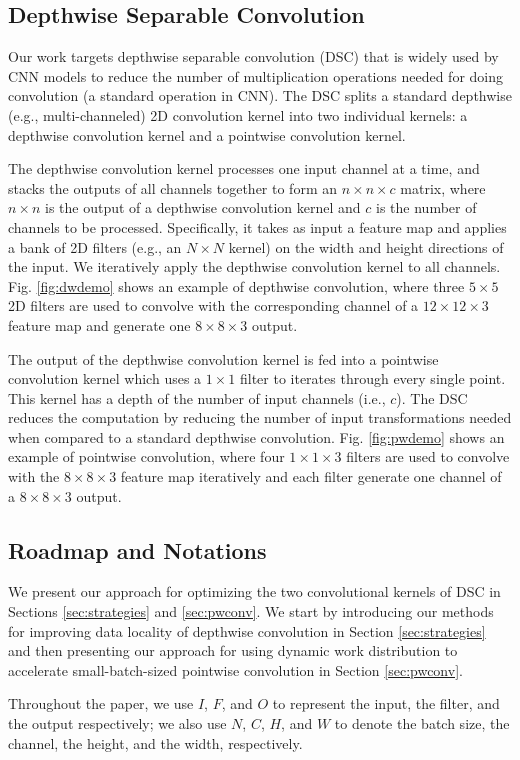 \subsection{Depthwise Separable Convolution}
Our work targets depthwise separable convolution (DSC) that is widely used by  CNN  models to reduce the number of multiplication
operations needed for doing convolution (a standard operation in CNN). The DSC splits a standard depthwise (e.g., multi-channeled) 2D
convolution kernel into two individual kernels: a depthwise convolution kernel and a pointwise convolution kernel. 

The depthwise
convolution kernel processes one input channel at a time, and stacks the outputs of all channels together to form an $n \times n \times c$
matrix, where $n \times n$ is the output of a depthwise convolution kernel and $c$ is the number of channels to be processed. Specifically,
it takes as input a feature map and applies a bank of 2D filters (e.g., an $N \times N$ kernel) on the width and height directions of
the input. We iteratively apply the depthwise convolution kernel to all channels. Fig. \ref{fig:dwdemo} shows an example of depthwise convolution, where three $5 \times 5$ 2D filters are used to convolve with the corresponding channel of a $12 \times 12 \times 3$ feature map and generate one $8 \times 8 \times 3$ output. 

The output of the depthwise convolution kernel is fed
into a pointwise convolution kernel which uses a $1 \times 1$ filter to iterates through every single point. This kernel has a depth of the
number of input channels (i.e., $c$). The DSC reduces the computation by reducing the number of input transformations needed when compared
to a standard depthwise convolution. Fig. \ref{fig:pwdemo} shows an example of pointwise convolution, where four $1 \times 1 \times 3$ filters are used to convolve with the $8 \times 8 \times 3$ feature map iteratively and each filter generate one channel of a $8 \times 8 \times 3$ output.


\subsection{Roadmap and Notations} We present our approach for optimizing the two convolutional kernels of DSC in
Sections \ref {sec:strategies} and \ref {sec:pwconv}. We start by introducing our methods for improving data locality of depthwise
convolution in Section \ref{sec:strategies} and then presenting our approach for using dynamic work distribution to accelerate
small-batch-sized pointwise convolution in Section \ref {sec:pwconv}.

 Throughout the paper, we use $I$, $F$, and $O$ to represent the input, the filter, and the output respectively; we also
use $N$, $C$, $H$, and $W$ to denote the batch size, the channel, the height, and the width, respectively.

